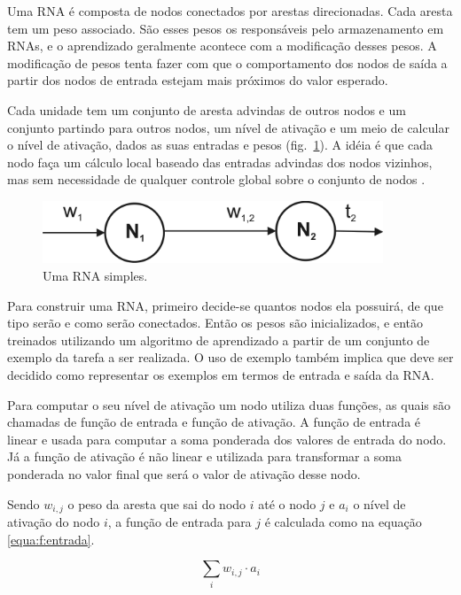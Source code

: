 Uma RNA é composta de nodos conectados por arestas direcionadas. Cada aresta tem um peso associado. São esses pesos os responsáveis pelo armazenamento em RNAs, e o aprendizado geralmente acontece com a modificação desses pesos. A modificação de pesos tenta fazer com que o comportamento dos nodos de saída a partir dos nodos de entrada estejam mais próximos do valor esperado.

Cada unidade tem um conjunto de aresta advindas de outros nodos e um conjunto partindo para outros nodos, um nível de ativação e um meio de calcular o nível de ativação, dados as suas entradas e pesos (fig.~\ref{fig:rnaSimples}). A idéia é que cada nodo faça um cálculo local baseado das entradas advindas dos nodos vizinhos, mas sem necessidade de qualquer controle global sobre o conjunto de nodos \cite{russel:modern}.

\begin{figure}[ht]
 \begin{center}
  \includegraphics[width=4in]{imagens/rnaSimples.png}
 \end{center}
 \caption{Uma RNA simples.}
 \label{fig:rnaSimples}
\end{figure}

Para construir uma RNA, primeiro decide-se quantos nodos ela possuirá, de que tipo serão e como serão conectados. Então os pesos são inicializados, e então treinados utilizando um algoritmo de aprendizado a partir de um conjunto de exemplo da tarefa a ser realizada. O uso de exemplo também implica que deve ser decidido como representar os exemplos em termos de entrada e saída da RNA.

Para computar o seu nível de ativação um nodo utiliza duas funções, as quais são chamadas de função de entrada e função de ativação. A função de entrada é linear e usada para computar a soma ponderada dos valores de entrada do nodo. Já a função de ativação é não linear e utilizada para transformar a soma ponderada no valor final que será o valor de ativação desse nodo.

Sendo $w_{i,j}$ o peso da aresta que sai do nodo $i$ até o nodo $j$ e $a_i$ o nível de ativação do nodo $i$, a função de entrada para $j$ é calculada como na equação \ref{equa:f:entrada}.

\begin{equation}
	\sum_{i} w_{i,j} \cdot a_i
	\label{equa:f:entrada}
\end{equation}


